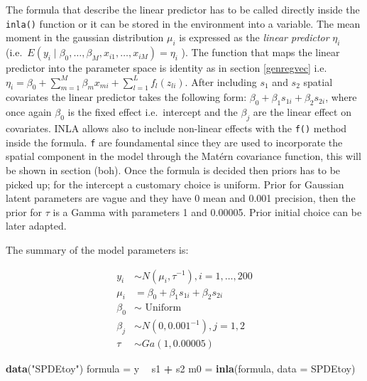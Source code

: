 \documentclass[
  12pt,
  a4paper,
  oneside]{book}
\newenvironment{Shaded}{\begin{snugshade}}{\end{snugshade}}
\newcommand{\DataTypeTok}[1]{\textcolor[rgb]{0.13,0.29,0.53}{#1}}
\newcommand{\KeywordTok}[1]{\textcolor[rgb]{0.13,0.29,0.53}{\textbf{#1}}}
\newcommand{\NormalTok}[1]{#1}
\newcommand{\OperatorTok}[1]{\textcolor[rgb]{0.81,0.36,0.00}{\textbf{#1}}}
\newcommand{\StringTok}[1]{\textcolor[rgb]{0.31,0.60,0.02}{#1}}
\begin{document}
The formula that describe the linear predictor has to be called directly inside the \texttt{inla()} function or it can be stored in the environment into a variable. The mean moment in the gaussian distribution \(\mu_{i}\) is expressed as the \emph{linear predictor} \(\eta_{i}\) (i.e.~\(E\left(y_{i} \mid \beta_{0}, \ldots, \beta_{M}, x_{i 1}, \ldots, x_{i M}\right) = \eta_{i}\) ). The function that maps the linear predictor into the parameter space is identity as in section \ref{genregvec} i.e.~\(\eta_{i}=\beta_{0}+\sum_{m=1}^{M} \beta_{m} x_{m i}+\sum_{l=1}^{L} f_{l}\left(z_{l i}\right)\).
After including \(s_{1}\) and \(s_{2}\) spatial covariates the linear predictor takes the following form: \(\beta_{0}+\beta_{1} s_{1 i}+\beta_{2} s_{2 i}\), where once again \(\beta_{0}\) is the fixed effect i.e.~intercept and the \(\beta_{j}\) are the linear effect on covariates. INLA allows also to include non-linear effects with the \texttt{f()} method inside the formula. \texttt{f} are foundamental since they are used to incorporate the spatial component in the model through the Matérn covariance function, this will be shown in section (boh).
Once the formula is decided then priors has to be picked up; for the intercept a customary choice is uniform. Prior for Gaussian latent parameters are vague and they have 0 mean and 0.001 precision, then the prior for \(\tau\) is a Gamma with parameters 1 and 0.00005. Prior initial choice can be later adapted.

The summary of the model parameters is:

\[
\begin{aligned}
y_{i} & \sim N\left(\mu_{i}, \tau^{-1}\right), i=1, \ldots, 200 \\
\mu_{i} &=\beta_{0}+\beta_{1} s_{1 i}+\beta_{2} s_{2 i} \\
\beta_{0} & \sim \text { Uniform } \\
\beta_{j} & \sim N\left(0,0.001^{-1}\right), j=1,2 \\
\tau & \sim G a(1,0.00005)
\end{aligned}
\]

\begin{Shaded}
\begin{Highlighting}[]
\KeywordTok{data}\NormalTok{(}\StringTok{"SPDEtoy"}\NormalTok{)}
\NormalTok{formula =}\StringTok{ }\NormalTok{y }\OperatorTok{~}\StringTok{ }\NormalTok{s1 }\OperatorTok{+}\StringTok{ }\NormalTok{s2}
\NormalTok{m0 =}\StringTok{ }\KeywordTok{inla}\NormalTok{(formula, }\DataTypeTok{data =}\NormalTok{ SPDEtoy)}
\end{Highlighting}
\end{Shaded}
\end{document}
